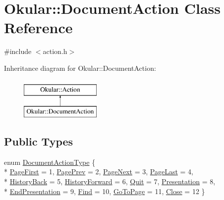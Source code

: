 \hypertarget{classOkular_1_1DocumentAction}{\section{Okular\+:\+:Document\+Action Class Reference}
\label{classOkular_1_1DocumentAction}
}


{\ttfamily \#include $<$action.\+h$>$}

Inheritance diagram for Okular\+:\+:Document\+Action\+:\begin{figure}[H]
\begin{center}
\leavevmode
\includegraphics[height=2.000000cm]{classOkular_1_1DocumentAction}
\end{center}
\end{figure}
\subsection*{Public Types}
\begin{DoxyCompactItemize}
\item 
enum \hyperlink{classOkular_1_1DocumentAction_a59b262b16719b9b55005d7c143f9415d}{Document\+Action\+Type} \{ \\*
\hyperlink{classOkular_1_1DocumentAction_a59b262b16719b9b55005d7c143f9415da7869da1d0b74ce9ce9a9070b34b2be24}{Page\+First} = 1, 
\hyperlink{classOkular_1_1DocumentAction_a59b262b16719b9b55005d7c143f9415dac1474e9f7d9e6b6c11a34886e50b1b65}{Page\+Prev} = 2, 
\hyperlink{classOkular_1_1DocumentAction_a59b262b16719b9b55005d7c143f9415da2d3cbb486bd211639576abfd5fd94e84}{Page\+Next} = 3, 
\hyperlink{classOkular_1_1DocumentAction_a59b262b16719b9b55005d7c143f9415da709252da0779def85883e4bf7cc62f9d}{Page\+Last} = 4, 
\\*
\hyperlink{classOkular_1_1DocumentAction_a59b262b16719b9b55005d7c143f9415dae079522fa5f0031dbbeed33268539e76}{History\+Back} = 5, 
\hyperlink{classOkular_1_1DocumentAction_a59b262b16719b9b55005d7c143f9415dab58e7d7531192c958120707dfb6ff207}{History\+Forward} = 6, 
\hyperlink{classOkular_1_1DocumentAction_a59b262b16719b9b55005d7c143f9415da1a39122cb11c1670518ac8e2e0172580}{Quit} = 7, 
\hyperlink{classOkular_1_1DocumentAction_a59b262b16719b9b55005d7c143f9415da3fa4633dc079caff574aa6cf53ecd9e2}{Presentation} = 8, 
\\*
\hyperlink{classOkular_1_1DocumentAction_a59b262b16719b9b55005d7c143f9415dabf1a56bd98eb58d5c7551e8b081f53d9}{End\+Presentation} = 9, 
\hyperlink{classOkular_1_1DocumentAction_a59b262b16719b9b55005d7c143f9415da2e1fb485a14ebf1b0c50391e20a20d09}{Find} = 10, 
\hyperlink{classOkular_1_1DocumentAction_a59b262b16719b9b55005d7c143f9415da8a1b21cdefb94d4a0a2277704e43028d}{Go\+To\+Page} = 11, 
\hyperlink{classOkular_1_1DocumentAction_a59b262b16719b9b55005d7c143f9415da953dd7dbf1b08110bb7018597de9033a}{Close} = 12
 \}
\end{DoxyCompactItemize}
